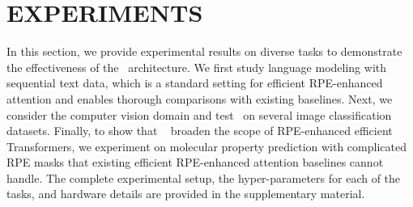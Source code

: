 \section{EXPERIMENTS}
\label{sec:expeeriments}

In this section, we provide experimental results on diverse tasks to demonstrate the effectiveness of the \FLT~architecture. We first study language modeling with sequential text data, which is a standard setting for efficient RPE-enhanced attention and enables thorough comparisons with existing baselines. Next, we consider the computer vision domain and test \FLTs~on several image classification datasets. Finally, to show that \FLTs~ broaden the scope of RPE-enhanced efficient Transformers, we experiment on molecular property prediction with complicated RPE masks that existing efficient RPE-enhanced attention baselines cannot handle. The complete experimental setup, the hyper-parameters for each of the tasks, and hardware details are provided in the supplementary material.

\begin{table}
    \begin{center}
    \caption{\textbf{Language model perplexity scores} on the WikiText-103 validation set. The lowest perplexity is highlighted in \textbf{bold}.}\label{tab:lm}
    \end{center}
\end{table}

